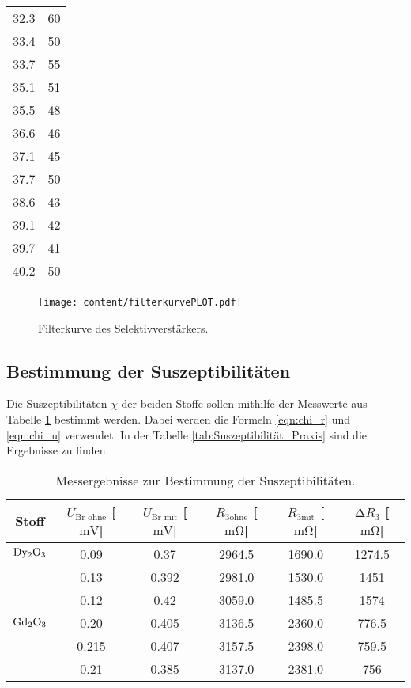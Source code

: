 \begin{table}
\begin{tabular}{c c}
      32.3   & 60 \\
      33.4   & 50 \\
      33.7   & 55 \\
      35.1   & 51 \\
      35.5   & 48 \\
      36.6   & 46 \\
      37.1   & 45 \\
      37.7   & 50 \\
      38.6   & 43 \\
      39.1   & 42 \\
      39.7   & 41 \\
      40.2   & 50 \\
    \bottomrule
  \end{tabular}
\end{table}

\begin{figure}
  \centering
  \caption{Filterkurve des Selektivverstärkers.}
  \label{fig:filterkurvePLOT}
  \texttt{[image: content/filterkurvePLOT.pdf]}
\end{figure}

\subsection{Bestimmung der Suszeptibilitäten}
\label{subsec:Suszeptibilität}

Die Suszeptibilitäten $\chi$ der beiden Stoffe sollen mithilfe der Messwerte aus Tabelle \ref{tab:Messwerte} bestimmt werden.
Dabei werden die Formeln \eqref{eqn:chi_r} und \eqref{eqn:chi_u} verwendet.
In der Tabelle \ref{tab:Suszeptibilität_Praxis} sind die Ergebnisse zu finden.

\begin{table}
  \centering
  \caption{Messergebnisse zur Bestimmung der Suszeptibilitäten.}
  \label{tab:Messwerte}
  \begin{tabular}{c c c c c c}
    \toprule
    {Stoff} & {$U_{\text{Br ohne}}$ [$\si{\milli\volt}$]} & {$U_{\text{Br mit}}$ [$\si{\milli\volt}$]} & {$R_{3 \text{ohne}}$ [$\si{\milli\ohm}$]} &{$R_{3 \text{mit}}$ [$\si{\milli\ohm}$]} & {$\increment R_3$ [$\si{\milli\ohm}$]}\\
    \midrule
    $\ce{Dy2O3}$ & 0.09 & 0.37 & 2964.5 & 1690.0 & 1274.5\\
              &0.13 & 0.392 & 2981.0 & 1530.0 & 1451\\
              &0.12 & 0.42 & 3059.0 & 1485.5 & 1574\\
    $\ce{Gd2O3}$ &0.20 & 0.405 & 3136.5 & 2360.0 & 776.5\\
              &0.215 & 0.407 & 3157.5 & 2398.0 & 759.5\\
              &0.21 & 0.385 & 3137.0 & 2381.0 & 756\\
    \bottomrule
  \end{tabular}
\end{table}

